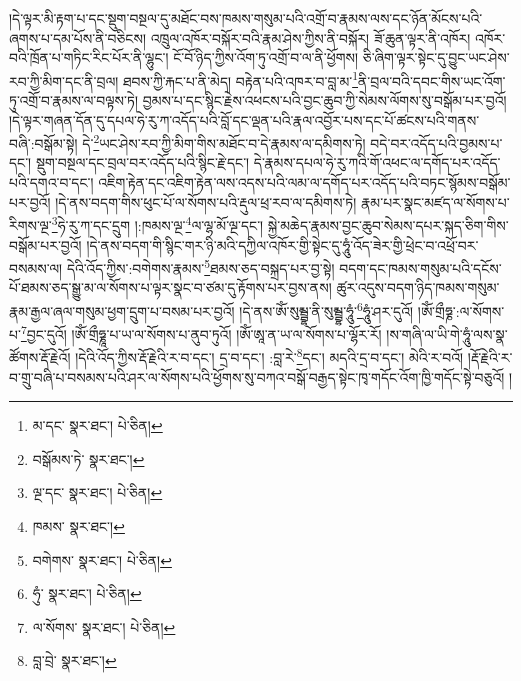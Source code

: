 །དེ་ལྟར་མི་རྟག་པ་དང་སྡུག་བསྔལ་དུ་མཐོང་བས་ཁམས་གསུམ་པའི་འགྲོ་བ་རྣམས་ལས་དང་ཉོན་མོངས་པའི་ཞགས་པ་དམ་པོས་ནི་བཅིངས། འཁྲུལ་འཁོར་བསྐོར་བའི་རྣམ་ཤེས་ཀྱིས་ནི་བསྐོར། ཟོ་ཆུན་ལྟར་ནི་འཁོར། འཁོར་བའི་ཁྲོན་པ་གཏིང་རིང་པོར་ནི་ལྷུང་། ངོ་བོ་ཉིད་ཀྱིས་འོག་ཏུ་འགྲོ་བ་ལ་ནི་ཕྱོགས། ཅི་ཞིག་ལྟར་སྟེང་དུ་བྱུང་ཡང་ཤེས་རབ་ཀྱི་མིག་དང་ནི་བྲལ། ཐབས་ཀྱི་རྐང་པ་ནི་མེད། བརྟེན་པའི་འཁར་བ་བླ་མ་\footnote{མ་དང་  སྣར་ཐང་།  པེ་ཅིན། }ནི་བྲལ་བའི་དབང་གིས་ཡང་འོག་ཏུ་འགྲོ་བ་རྣམས་ལ་བལྟས་ཏེ། བྱམས་པ་དང་སྙིང་རྗེས་འཕངས་པའི་བྱང་ཆུབ་ཀྱི་སེམས་ལོགས་སུ་བསྒོམ་པར་བྱའོ། །དེ་ལྟར་གཞན་དོན་དུ་དཔལ་ཧེ་རུ་ཀ་འདོད་པའི་བློ་དང་ལྡན་པའི་རྣལ་འབྱོར་པས་དང་པོ་ཚངས་པའི་གནས་བཞི་:བསྒོམ་སྟེ། དེ་\footnote{བསྒོམས་ཏེ་  སྣར་ཐང་། }ཡང་ཤེས་རབ་ཀྱི་མིག་གིས་མཐོང་བ་དེ་རྣམས་ལ་དམིགས་ཏེ། བདེ་བར་འདོད་པའི་བྱམས་པ་དང་། སྡུག་བསྔལ་དང་བྲལ་བར་འདོད་པའི་སྙིང་རྗེ་དང་། དེ་རྣམས་དཔལ་ཧེ་རུ་ཀའི་གོ་འཕང་ལ་དགོད་པར་འདོད་པའི་དགའ་བ་དང་། འཇིག་རྟེན་དང་འཇིག་རྟེན་ལས་འདས་པའི་ལམ་ལ་དགོད་པར་འདོད་པའི་བཏང་སྙོམས་བསྒོམ་པར་བྱའོ། །དེ་ནས་བདག་གིས་ཕུང་པོ་ལ་སོགས་པའི་རྡུལ་ཕྲ་རབ་ལ་དམིགས་ཏེ། རྣམ་པར་སྣང་མཛད་ལ་སོགས་པ་རིགས་ལྔ་\footnote{ལྔ་དང་  སྣར་ཐང་།  པེ་ཅིན། }ཧེ་རུ་ཀ་དང་དྲུག །:ཁམས་ལྔ་\footnote{ཁམས་  སྣར་ཐང་། }ལ་ལྷ་མོ་ལྔ་དང་། སྐྱེ་མཆེད་རྣམས་བྱང་ཆུབ་སེམས་དཔར་སྐད་ཅིག་གིས་བསྒོམ་པར་བྱའོ། །དེ་ནས་བདག་གི་སྙིང་གར་ཉི་མའི་དཀྱིལ་འཁོར་གྱི་སྟེང་དུ་ཧཱུཾ་འོད་ཟེར་གྱི་ཕྲེང་བ་འཕྲོ་བར་བསམས་ལ། དེའི་འོད་ཀྱིས་:བགེགས་རྣམས་\footnote{བགེགས་  སྣར་ཐང་།  པེ་ཅིན། }ཐམས་ཅད་བསྐྲད་པར་བྱ་སྟེ། བདག་དང་ཁམས་གསུམ་པའི་དངོས་པོ་ཐམས་ཅད་སྒྱུ་མ་ལ་སོགས་པ་ལྟར་སྣང་བ་ཙམ་དུ་རྟོགས་པར་བྱས་ནས། ཚུར་འདུས་བདག་ཉིད་ཁམས་གསུམ་རྣམ་རྒྱལ་ཞལ་གསུམ་ཕྱག་དྲུག་པ་བསམ་པར་བྱའོ། །དེ་ནས་ཨོཾ་སུམྦྷ་ནི་སུམྦྷ་ཧཱུཾ་\footnote{ཧུཾ་  སྣར་ཐང་།  པེ་ཅིན། }ཧཱུཾ་ཤར་དུའོ། །ཨོཾ་གྲྀཧྞ་:ལ་སོགས་པ་\footnote{ལ་སོགས་  སྣར་ཐང་།  པེ་ཅིན། }བྱང་དུའོ། །ཨོཾ་གྲྀཧྞཱ་པ་ཡ་ལ་སོགས་པ་ནུབ་ཏུའོ། །ཨོཾ་ཨཱ་ན་ཡ་ལ་སོགས་པ་ལྷོར་རོ། །ས་གཞི་ལ་ཡི་གེ་ཧཱུཾ་ལས་སྣ་ཚོགས་རྡོ་རྗེའོ། །དེའི་འོད་ཀྱིས་རྡོ་རྗེའི་ར་བ་དང་། དྲ་བ་དང་། :བླ་རེ་\footnote{བླ་བྲེ་  སྣར་ཐང་། }དང་། མདའི་དྲ་བ་དང་། མེའི་ར་བའོ། །རྡོ་རྗེའི་ར་བ་གྲུ་བཞི་པ་བསམས་པའི་ཤར་ལ་སོགས་པའི་ཕྱོགས་སུ་བཀའ་བསྒོ་བརྒྱད་སྟེང་ཁྭ་གདོང་འོག་ཁྱི་གདོང་སྟེ་བཅུའོ། །
